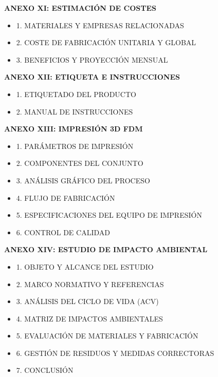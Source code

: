 \documentclass[11pt,a4paper]{article}
\begin{document}
\begin{description}[style=nextline, leftmargin=0.5cm, font=\bfseries\color{ArthroNavy}]
        \item \textbf{ANEXO XI: ESTIMACIÓN DE COSTES} 
        \begin{itemize}[label=\color{ArthroGray}\circ, leftmargin=0.5cm, itemsep=0.2em, topsep=0.1cm]
            \small
            \item 1. MATERIALES Y EMPRESAS RELACIONADAS
            \item 2. COSTE DE FABRICACIÓN UNITARIA Y GLOBAL 
            \item 3. BENEFICIOS Y PROYECCIÓN MENSUAL 
        \end{itemize}
        
        \item \textbf{ANEXO XII: ETIQUETA E INSTRUCCIONES} 
        \begin{itemize}[label=\color{ArthroGray}\circ, leftmargin=0.5cm, itemsep=0.2em, topsep=0.1cm]
            \small
            \item 1. ETIQUETADO DEL PRODUCTO 
            \item 2. MANUAL DE INSTRUCCIONES 
        \end{itemize}

        \item \textbf{ANEXO XIII: IMPRESIÓN 3D FDM} 
        \begin{itemize}[label=\color{ArthroGray}\circ, leftmargin=0.5cm, itemsep=0.2em, topsep=0.1cm]
            \small
            \item 1. PARÁMETROS DE IMPRESIÓN 
            \item 2. COMPONENTES DEL CONJUNTO 
            \item 3. ANÁLISIS GRÁFICO DEL PROCESO
            \item 4. FLUJO DE FABRICACIÓN
            \item 5. ESPECIFICACIONES DEL EQUIPO DE IMPRESIÓN 
            \item 6. CONTROL DE CALIDAD 
        \end{itemize}

     \item \textbf{ANEXO XIV: ESTUDIO DE IMPACTO AMBIENTAL} 
        \begin{itemize}[label=\color{ArthroGray}\circ, leftmargin=0.5cm, itemsep=0.2em, topsep=0.1cm]
            \small
            \item 1. OBJETO Y ALCANCE DEL ESTUDIO 
            \item 2. MARCO NORMATIVO Y REFERENCIAS
            \item 3. ANÁLISIS DEL CICLO DE VIDA (ACV) 
            \item 4. MATRIZ DE IMPACTOS AMBIENTALES 
            \item 5. EVALUACIÓN DE MATERIALES Y FABRICACIÓN
            \item 6. GESTIÓN DE RESIDUOS Y MEDIDAS CORRECTORAS
            \item 7. CONCLUSIÓN 
        \end{itemize}



\end{description}
\end{document}

